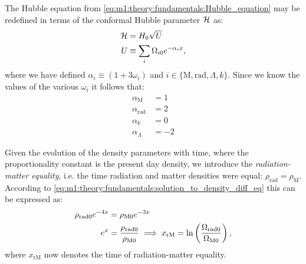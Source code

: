     The Hubble equation from \cref{eq:m1:theory:fundamentals:Hubble_equation} may be redefined in terms of the conformal Hubble parameter $\mathcal{H}$ as:
    \begin{equation}\label{eq:m1:lambdaCDM:conformal_Hubble_equation}
        \begin{split}
            \mathcal{H} &= H_0\sqrt{U}\\
            U &\equiv \sum_i\Omega_{i0}e^{-\alpha_ix}, 
        \end{split}
    \end{equation}
    where we have defined $\alpha_i\equiv(1+3\omega_i)$ and $i\in\{\mathrm{M}, \mathrm{rad}, \Lambda, k\}$. Since we know the values of the various $\omega_i$ it follows that:
    \begin{equation}
        \label{eq:m1:theory:lambdaCDM:alpha_values}
        \begin{split}
            \alpha_\mathrm{M} &= 1\\
            \alpha_\mathrm{rad} &= 2\\
            \alpha_k &= 0\\
            \alpha_\Lambda &= -2
        \end{split}
    \end{equation}

     Given the evolution of the density parameters with time, where the proportionality constant is the present day density, we introduce the \textit{radiation-matter equality}, i.e. the time radiation and matter densities were equal: $\rho_\mathrm{rad}=\rho_\mathrm{M}$. According to \cref{eq:m1:theory:fundamentals:solution_to_density_diff_eq} this can be expressed as:
     \begin{equation}\label{eq:m1:theory:equalities:radiation_matter}
        \begin{split}
            \rho_\mathrm{rad0}e^{-4x} &= \rho_\mathrm{M0}e^{-3x} \\
            e^x &= \frac{\rho_\mathrm{rad0}}{\rho_\mathrm{M0}} \implies x_\mathrm{rM} = \ln\left(\frac{\Omega_\mathrm{rad0}}{\Omega_\mathrm{M0}}\right),
        \end{split}
     \end{equation}
     where $x_\mathrm{rM}$ now denotes the time of radiation-matter equality. 

